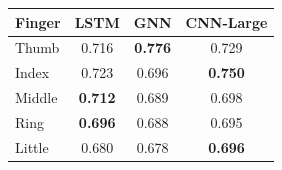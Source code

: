 \begin{tabular}{lccc}
\toprule
Finger & LSTM & GNN & CNN-Large \\
\midrule
Thumb  & 0.716 & \textbf{0.776} & 0.729 \\
Index  & 0.723 & 0.696 & \textbf{0.750} \\
Middle & \textbf{0.712} & 0.689 & 0.698 \\
Ring   & \textbf{0.696} & 0.688 & 0.695 \\
Little & 0.680 & 0.678 & \textbf{0.696} \\
\bottomrule
\end{tabular}
